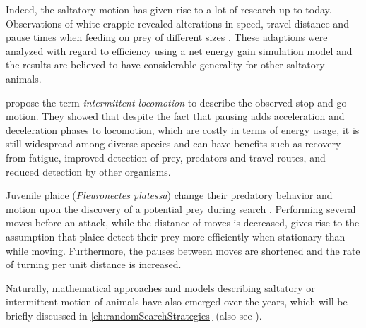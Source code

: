 Indeed, the saltatory motion has given rise to a lot of research up to today. Observations of white crappie revealed alterations in speed, travel distance and pause times when feeding on prey of different sizes \cite{obrien:1989}. These adaptions were analyzed with regard to efficiency using a net energy gain simulation model and the results are believed to have considerable generality for other saltatory animals.

 propose the term \textit{intermittent locomotion} to describe the observed stop-and-go motion. They showed that despite the fact that pausing adds acceleration and deceleration phases to locomotion, which are costly in terms of energy usage, it is still widespread among diverse species and can have benefits such as recovery from fatigue, improved detection of prey, predators and travel routes, and reduced detection by other organisms.

Juvenile plaice (\textit{Pleuronectes platessa}) change their predatory behavior and motion upon the discovery of a potential prey during search \cite{hill:2000}. Performing several moves before an attack, while the distance of moves is decreased, gives rise to the assumption that plaice detect their prey more efficiently when stationary than while moving. Furthermore, the pauses between moves are shortened and the rate of turning per unit distance is increased.

Naturally, mathematical approaches and models describing saltatory or intermittent motion of animals have also emerged over the years, which will be briefly discussed in \autoref{ch:randomSearchStrategies} (also see \eg \cite{reynolds:2006, benichou:2011}).

